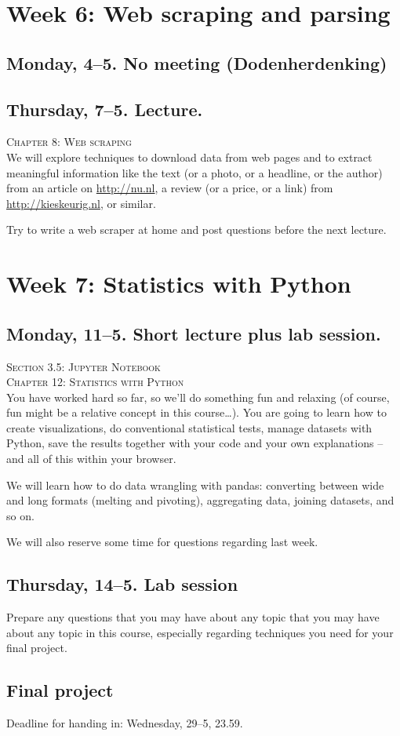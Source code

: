 \section*{Week 6: Web scraping and parsing}

\subsection*{Monday, 4--5. No meeting (Dodenherdenking)}


\subsection*{Thursday, 7--5. Lecture.}
\textsc{ Chapter 8: Web scraping}\\
We will explore techniques to download data from web pages and to extract meaningful information like the text (or a photo, or a headline, or the author) from an article on \url{http://nu.nl}, a review (or a price, or a link) from \url{http://kieskeurig.nl}, or similar. 

Try to write a web scraper at home and post questions before the next lecture.




\section*{Week 7: Statistics with Python}

\subsection*{Monday, 11--5. Short lecture plus lab session.}
\textsc{ Section 3.5: Jupyter Notebook}\\
\textsc{ Chapter 12: Statistics with Python}\\
You have worked hard so far, so we'll do something fun and relaxing (of course, fun might be a relative concept in this course\ldots). You are going to learn how to create visualizations, do conventional statistical tests, manage datasets with Python, save the results together with your code and your own explanations -- and all of this within your browser.

We will learn how to do data wrangling with pandas: converting between wide and long formats (melting and pivoting), aggregating data, joining datasets, and so on.

We will also reserve some time for questions regarding last week.


\subsection*{Thursday, 14--5. Lab session}
Prepare any questions that you may have about any topic that you may have about any topic in this course, especially regarding techniques you need for your final project.



\subsection*{Final project}
Deadline for handing in: Wednesday, 29--5, 23.59.

